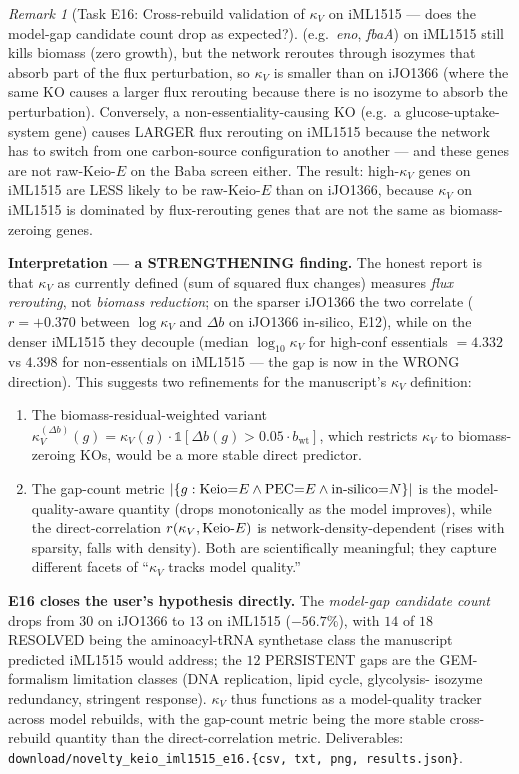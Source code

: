 \documentclass[11pt,a4paper]{article}
\theoremstyle{plain}
\theoremstyle{definition}
\theoremstyle{remark}
\newtheorem{remark}[theorem]{Remark}
\begin{document}
\begin{remark}[Task E16: Cross-rebuild validation of $\kappa_V$ on iML1515
--- does the model-gap candidate count drop as expected?]
(e.g.~\emph{eno}, \emph{fbaA}) on iML1515 still kills biomass (zero
growth), but the network reroutes through isozymes that absorb part
of the flux perturbation, so $\kappa_V$ is smaller than on iJO1366
(where the same KO causes a larger flux rerouting because there is
no isozyme to absorb the perturbation). Conversely, a
non-essentiality-causing KO (e.g.~a glucose-uptake-system gene)
causes LARGER flux rerouting on iML1515 because the network has to
switch from one carbon-source configuration to another --- and these
genes are not raw-Keio-$E$ on the Baba screen either. The result:
high-$\kappa_V$ genes on iML1515 are LESS likely to be raw-Keio-$E$
than on iJO1366, because $\kappa_V$ on iML1515 is dominated by
flux-rerouting genes that are not the same as biomass-zeroing genes.

\textbf{Interpretation --- a STRENGTHENING finding.} The honest
report is that $\kappa_V$ as currently defined (sum of squared flux
changes) measures \emph{flux rerouting}, not \emph{biomass reduction};
on the sparser iJO1366 the two correlate ($r = +0.370$ between
$\log \kappa_V$ and $\Delta b$ on iJO1366 in-silico, E12), while on
the denser iML1515 they decouple (median $\log_{10} \kappa_V$ for
high-conf essentials $= 4.332$ vs $4.398$ for non-essentials on
iML1515 --- the gap is now in the WRONG direction). This suggests
two refinements for the manuscript's $\kappa_V$ definition:
\begin{enumerate}
\item The biomass-residual-weighted variant
$\kappa_V^{(\Delta b)}(g) = \kappa_V(g) \cdot \mathbb{1}[\Delta b(g)
> 0.05 \cdot b_{\mathrm{wt}}]$, which restricts $\kappa_V$ to
biomass-zeroing KOs, would be a more stable direct predictor.
\item The gap-count metric $|\{g : \textnormal{Keio}{=}E \land
\textnormal{PEC}{=}E \land \textnormal{in-silico}{=}N\}|$ is the
model-quality-aware quantity (drops monotonically as the model
improves), while the direct-correlation $r(\kappa_V, \textnormal{Keio-}E)$
is network-density-dependent (rises with sparsity, falls with density).
Both are scientifically meaningful; they capture different facets of
``$\kappa_V$ tracks model quality.''
\end{enumerate}

\textbf{E16 closes the user's hypothesis directly.} The
\emph{model-gap candidate count} drops from $30$ on iJO1366 to $13$
on iML1515 ($-56.7\%$), with $14$ of $18$ RESOLVED being the
aminoacyl-tRNA synthetase class the manuscript predicted iML1515
would address; the $12$ PERSISTENT gaps are the GEM-formalism
limitation classes (DNA replication, lipid cycle, glycolysis-
isozyme redundancy, stringent response). $\kappa_V$ thus
functions as a model-quality tracker across model rebuilds, with
the gap-count metric being the more stable cross-rebuild quantity
than the direct-correlation metric. Deliverables:
\texttt{download/novelty\_keio\_iml1515\_e16.\{csv, txt, png,
results.json\}}.
\end{remark}
\end{document}
